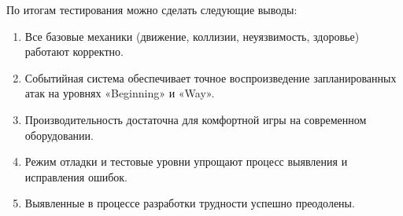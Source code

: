 \documentclass[../main.tex]{subfiles}
\begin{document}
По итогам тестирования можно сделать следующие выводы:
\begin{enumerate}
	\item Все базовые механики (движение, коллизии, неуязвимость, здоровье) работают корректно.
	\item Событийная система обеспечивает точное воспроизведение запланированных атак на уровнях «Beginning» и «Way».
	\item Производительность достаточна для комфортной игры на современном оборудовании.
	\item Режим отладки и тестовые уровни упрощают процесс выявления и исправления ошибок.
	\item Выявленные в процессе разработки трудности успешно преодолены.
\end{enumerate}
\end{document}

